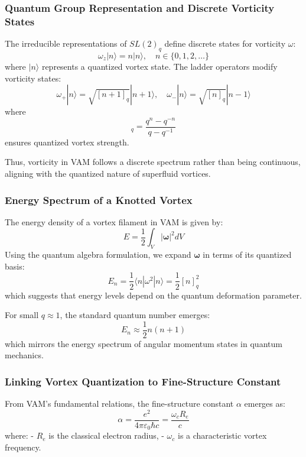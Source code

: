 \subsubsection*{Quantum Group Representation and Discrete Vorticity States}
The irreducible representations of $SL(2)_q$ define discrete states for vorticity $\omega$:
\begin{equation*}
    \omega_z |n\rangle = n |n\rangle, \quad n \in \{0, 1, 2, \dots\}
\end{equation*}
where $|n\rangle$ represents a quantized vortex state. The ladder operators modify vorticity states:
\begin{equation*}
    \omega_+ |n\rangle = \sqrt{[n+1]_q} |n+1\rangle, \quad \omega_- |n\rangle = \sqrt{[n]_q} |n-1\rangle
\end{equation*}
where
\begin{equation*}
[n]_q = \frac{q^n - q^{-n}}{q - q^{-1}}
\end{equation*}
ensures quantized vortex strength.

Thus, vorticity in VAM follows a discrete spectrum rather than being continuous, aligning with the quantized nature of superfluid vortices.

\subsubsection*{Energy Spectrum of a Knotted Vortex}
The energy density of a vortex filament in VAM is given by:
\begin{equation*}
    E = \frac{1}{2} \int_V |\boldsymbol{\omega}|^2 dV
\end{equation*}
Using the quantum algebra formulation, we expand $\boldsymbol{\omega}$ in terms of its quantized basis:
\begin{equation*}
    E_n = \frac{1}{2} \langle n | \omega^2 | n \rangle = \frac{1}{2} [n]_q^2
\end{equation*}
which suggests that energy levels depend on the quantum deformation parameter.

For small $q \approx 1$, the standard quantum number emerges:
\begin{equation*}
    E_n \approx \frac{1}{2} n(n+1)
\end{equation*}
which mirrors the energy spectrum of angular momentum states in quantum mechanics.

\subsubsection*{Linking Vortex Quantization to Fine-Structure Constant}
From VAM's fundamental relations, the fine-structure constant $\alpha$ emerges as:
\begin{equation*}
    \alpha = \frac{e^2}{4\pi \varepsilon_0 \hbar c} = \frac{\omega_c R_e}{c}
\end{equation*}
where:
- $R_e$ is the classical electron radius,
- $\omega_c$ is a characteristic vortex frequency.

